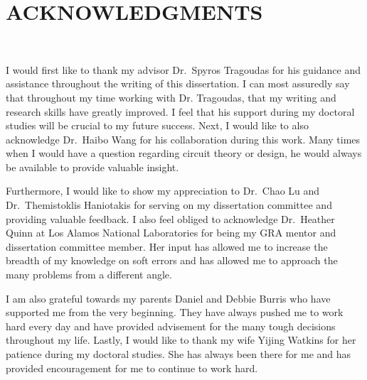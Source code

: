 


\chapter*{ACKNOWLEDGMENTS}\\

I would first like to thank my advisor Dr.\ Spyros Tragoudas for his guidance and assistance throughout the writing of this dissertation. I can most assuredly say that throughout my time working with Dr. Tragoudas, that my writing and research skills have greatly improved. I feel that his support during my doctoral studies will be crucial to my future success. Next, I would like to also acknowledge Dr.\ Haibo Wang for his collaboration during this work. Many times when I would have a question regarding circuit theory or design, he would always be available to provide valuable insight.

Furthermore, I would like to show my appreciation to Dr.\ Chao Lu and Dr.\ Themistoklis Haniotakis for serving on my dissertation committee and providing valuable feedback. I also feel obliged to acknowledge Dr.\ Heather Quinn at Los Alamos National Laboratories for being my GRA mentor and dissertation committee member. Her input has allowed me to increase the breadth of my knowledge on soft errors and has allowed me to approach the many problems from a different angle. 

I am also grateful towards my parents Daniel and Debbie Burris who have supported me from the very beginning. They have always pushed me to work hard every day and have provided advisement for the many tough decisions throughout my life. Lastly, I would like to thank my wife Yijing Watkins for her patience during my doctoral studies. She has always been there for me and has provided encouragement for me to continue to work hard.  

\newpage
